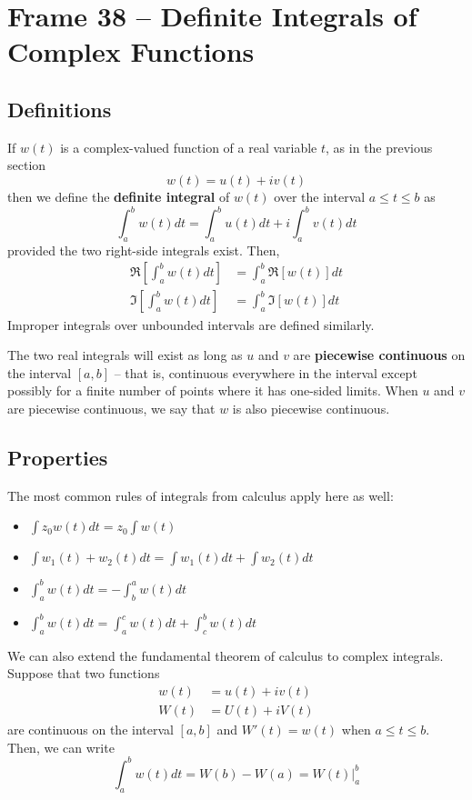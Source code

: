\documentclass{article}
\renewcommand{\emph}{\textbf}
\begin{document}
\clearpage
\section{Frame 38 -- Definite Integrals of Complex Functions}
\subsection{Definitions}
If $w(t)$ is a complex-valued function of a real variable $t$, as in the previous section
\[
	w(t) = u(t) + iv(t)
\]
then we define the \emph{definite integral} of $w(t)$ over the interval $a \le t \le b$ as
\[
	\int_a^b w(t) dt = \int_a^b u(t) dt + i \int_a^b v(t) dt
\]
provided the two right-side integrals exist. Then,
\begin{align*}
	\Re\left[\int_a^b w(t)dt\right] &= \int_a^b \Re[w(t)] dt \\
	\Im\left[\int_a^b w(t)dt\right] &= \int_a^b \Im[w(t)] dt
\end{align*}
Improper integrals over unbounded intervals are defined similarly.

The two real integrals will exist as long as $u$ and $v$ are \emph{piecewise continuous} on the interval $[a, b]$ -- that is, continuous everywhere in the interval except possibly for a finite number of points where it has one-sided limits. When $u$ and $v$ are piecewise continuous, we say that $w$ is also piecewise continuous.

\subsection{Properties}
The most common rules of integrals from calculus apply here as well:
\begin{itemize}
	\item $\int z_0 w(t)dt = z_0 \int w(t)$
	
	\item $\int w_1(t) + w_2(t)dt = \int w_1(t)dt + \int w_2(t)dt$
	
	\item $\int_a^b w(t) dt = -\int_b^a w(t) dt$
	
	\item $\int_a^b w(t) dt = \int_a^c w(t) dt + \int_c^b w(t) dt$
\end{itemize}

We can also extend the fundamental theorem of calculus to complex integrals. Suppose that two functions
\begin{align*}
	w(t) &= u(t) + iv(t) \\
	W(t) &= U(t) + iV(t) 
\end{align*}
are continuous on the interval $[a, b]$ and $W'(t) = w(t)$ when $a \le t \le b$. Then, we can write
\[
	\int_a^b w(t) dt = W(b) - W(a) = W(t) \Big|_a^b 
\] 
\end{document}
